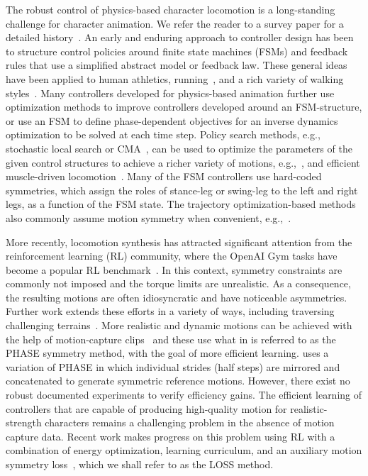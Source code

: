 The robust control of physics-based character locomotion is a long-standing challenge
for character animation. We refer the reader to a survey paper for a detailed history~\cite{STAR2012}.  
An early and enduring approach to controller design has been to structure control policies around finite state
machines (FSMs) and feedback rules that use a simplified abstract model or feedback law.  These general
ideas have been applied to human athletics, running~\cite{Hodgins95}, and a rich variety of walking
styles~\cite{Yin07,Coros10,LeeYS10}. Many controllers developed for physics-based animation
further use optimization methods to improve controllers developed around an FSM-structure, or use an FSM to 
define phase-dependent objectives for an inverse dynamics optimization to be solved at each time step.
Policy search methods, e.g., stochastic local search or CMA~\cite{Hansen06}, can be used to optimize the 
parameters of the given control structures to achieve a richer variety of motions, e.g.,~\cite{Yin07,Coros11}, and
efficient muscle-driven locomotion~\cite{Wang09}.  
Many of the FSM controllers use hard-coded symmetries, which assign the roles of stance-leg or swing-leg
to the left and right legs, as a function of the FSM state.
The trajectory optimization-based methods also commonly assume motion symmetry when convenient, e.g.,~\cite{majkowska2007flipping}.


More recently, locomotion synthesis has attracted significant
attention from the reinforcement learning (RL) community, where the OpenAI Gym tasks have 
become a popular RL benchmark~\cite{ref:OpenAI-Gym}. In this context, symmetry constraints are commonly 
not imposed and the torque limits are unrealistic. As a consequence, the resulting motions are often idiosyncratic and have noticeable asymmetries.
Further work extends these efforts in a variety of ways, including traversing challenging terrains~\cite{ref:deepmindParkour}.
More realistic and dynamic motions can be achieved with the help of motion-capture clips~\cite{2017-TOG-deepLoco,2018-TOG-deepMimic} and these use what in  is referred to as the PHASE symmetry method, with the goal of more efficient learning. \cite{2016-TOG-controlGraphs} uses a variation of PHASE in which individual strides (half steps) are mirrored and concatenated to generate symmetric reference motions.
However, there exist no robust documented experiments to verify efficiency gains.
The efficient learning of controllers that are capable of producing high-quality motion for realistic-strength characters remains
a challenging problem in the absence of motion capture data. Recent work makes
progress on this problem using RL with a combination of energy optimization, learning curriculum, and 
an auxiliary motion symmetry loss~\cite{Yu-SIGGRAPH-2018}, which we shall refer to as the LOSS method.
% 

